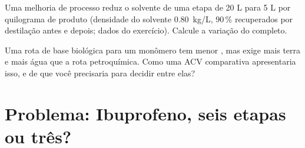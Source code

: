 \begin{exercise}[$\star\star\star$]\label{exo:b3:green-industrial:11}
Uma melhoria de processo reduz o solvente de uma etapa de 20 L para 5 L por quilograma de
produto (densidade do solvente \qty{0.80}{kg/L}, 90\,\% recuperados por destilação antes e depois; dados
do exercício). Calcule a variação do  completo.
\end{exercise}

\begin{exercise}[$\star\star\star$]\label{exo:b3:green-industrial:12}
Uma rota de base biológica para um monômero tem menor , mas exige mais terra
e mais água que a rota petroquímica. Como uma ACV comparativa apresentaria isso,
e de que você precisaria para decidir entre elas?
\end{exercise}

\section{Problema: Ibuprofeno, seis etapas ou três?}


